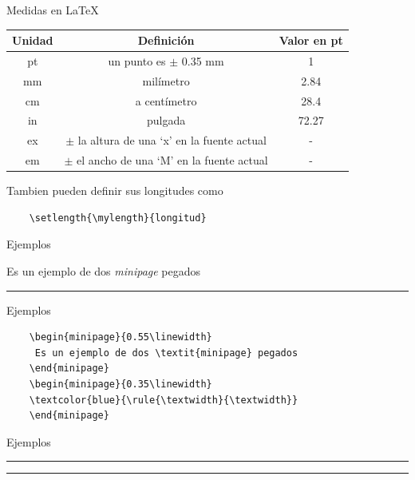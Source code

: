 \documentclass[dvipsnames,xcolor, handout]{beamer}
\theoremstyle{plain}
\theoremstyle{definition}
\begin{document}
\begin{frame}[fragile]{Medidas en \LaTeX\ }
\begin{tabular}{ccc}\hline
    Unidad & Definición & Valor en pt \\ \hline
    pt & un punto es $\pm$ 0.35 mm	& 1	\\
    mm	& milímetro	& 2.84 \\
    cm	& a centímetro	& 28.4 \\
    in	& pulgada	& 72.27 \\
    ex	& $\pm$ la altura de una `x' en la fuente actual &	- \\
    em	& $\pm$ el ancho de una `M' en la fuente actual	& -
\end{tabular}
    
    Tambien pueden definir sus longitudes como 
    \vspace*{-0.8cm}\begin{verbatim}
    \setlength{\mylength}{longitud}
\end{verbatim}
\end{frame}

\begin{frame}{Ejemplos}
    \begin{minipage}{0.55\linewidth}
     Es un ejemplo de dos \textit{minipage} pegados
    \end{minipage}
    \begin{minipage}{0.35\linewidth}
    \textcolor{blue}{\rule{\textwidth}{\textwidth}}
    \end{minipage}
\end{frame}

\begin{frame}[fragile]{Ejemplos}
\begin{verbatim}
    \begin{minipage}{0.55\linewidth}
     Es un ejemplo de dos \textit{minipage} pegados
    \end{minipage}
    \begin{minipage}{0.35\linewidth}
    \textcolor{blue}{\rule{\textwidth}{\textwidth}}
    \end{minipage}
\end{verbatim}
\end{frame}

\begin{frame}{Ejemplos}
    \begin{minipage}{0.49\linewidth}
    \textcolor{blue}{\rule{\textwidth}{\textwidth}}
    \end{minipage}
    \begin{minipage}{0.49\linewidth}
    \textcolor{red}{\rule{\textwidth}{
    \textwidth}}
    \end{minipage}
\end{frame}
\end{document}
